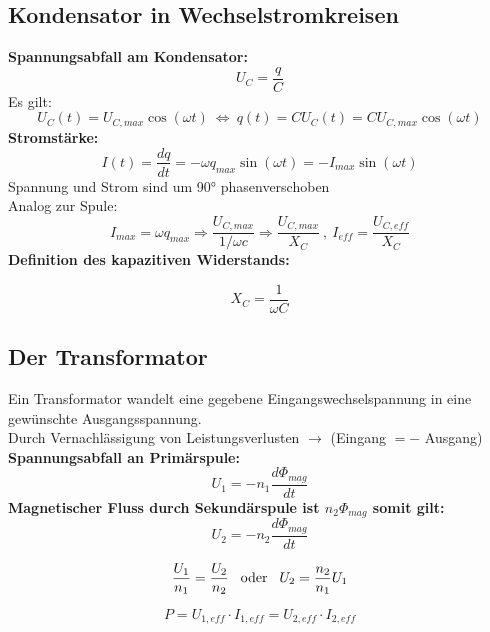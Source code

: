 \subsection{Kondensator in Wechselstromkreisen}
\textbf{Spannungsabfall am Kondensator:}
\[
    U_C = \frac{q}{C}
\]
\hspace{5mm} Es gilt:
\[
    U_C(t) = U_{C,max} \cos{(\omega t)} \ \iff \ q(t) = CU_C(t) = CU_{C,max} \cos{( \omega t)}
\]
\hspace{5mm} \textbf{Stromstärke:}
\[
    I(t) = \frac{dq}{dt} = - \omega q_{max} \sin{(\omega t)} = -I_{max} \sin{(\omega t)}
\]
Spannung und Strom sind um 90° phasenverschoben \\[1ex]
Analog zur Spule:
\[
    I_{max} = \omega q_{max} \Rightarrow \frac{U_{C,max}}{1/\omega c} \Rightarrow \frac{U_{C,max}}{X_C} \ , \ I_{eff} = \frac{U_{C,eff}}{X_C}
\]
\textbf{Definition des kapazitiven Widerstands:}
\begin{formulabox}
    \[
        X_C = \frac{1}{\omega C}
    \]
\end{formulabox}

\subsection{Der Transformator}
Ein Transformator wandelt eine gegebene Eingangswechselspannung in eine gewünschte Ausgangsspannung. \\[1ex]
Durch Vernachlässigung von Leistungsverlusten $\rightarrow$ (Eingang $=-$ Ausgang) \\[2ex]

\textbf{Spannungsabfall an Primärspule:}
\[
    U_1 = - n_1 \frac{d\Phi_{mag}}{dt}
\]
\textbf{Magnetischer Fluss durch Sekundärspule ist $n_2 \Phi_{mag}$ somit gilt:}
\[
     U_2 = - n_2 \frac{d\Phi_{mag}}{dt}
\]
\begin{formulabox}
    \[
        \frac{U_1}{n_1} = \frac{U_2}{n_2} \hspace{3mm} \text{oder} \hspace{3mm} U_2 = \frac{n_2}{n_1}U_1
    \]
\end{formulabox}
\[
    P = U_{1,eff} \cdot I_{1,eff} = U_{2,eff} \cdot I_{2,eff}
\]

